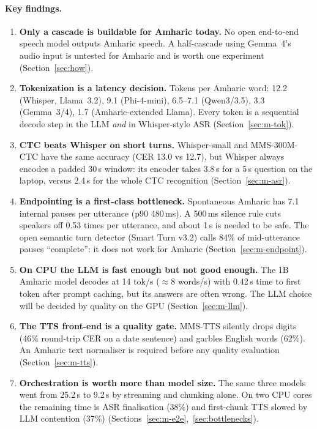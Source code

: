 \paragraph{Key findings.}
\begin{enumerate}
  \item \textbf{Only a cascade is buildable for Amharic today.} No open end-to-end speech model outputs
  Amharic speech. A half-cascade using Gemma~4's audio input is untested for Amharic and is worth one
  experiment (Section~\ref{sec:how}).
  \item \textbf{Tokenization is a latency decision.} Tokens per Amharic word: 12.2 (Whisper, Llama~3.2),
  9.1 (Phi-4-mini), 6.5--7.1 (Qwen3/3.5), 3.3 (Gemma~3/4), 1.7 (Amharic-extended Llama). Every token is a
  sequential decode step in the LLM \emph{and} in Whisper-style ASR (Section~\ref{sec:m-tok}).
  \item \textbf{CTC beats Whisper on short turns.} Whisper-small and MMS-300M-CTC have the same accuracy
  (CER 13.0 vs 12.7), but Whisper always encodes a padded 30\,s window: its encoder takes 3.8\,s for a 5\,s question
  on the laptop, versus 2.4\,s for the whole CTC recognition (Section~\ref{sec:m-asr}).
  \item \textbf{Endpointing is a first-class bottleneck.} Spontaneous Amharic has 7.1 internal pauses per
  utterance (p90 480\,ms). A 500\,ms silence rule cuts speakers off 0.53 times per utterance, and
  about 1\,s is needed to be safe. The open semantic turn detector (Smart Turn v3.2) calls 84\% of mid-utterance
  pauses ``complete'': it does not work for Amharic (Section~\ref{sec:m-endpoint}).
  \item \textbf{On CPU the LLM is fast enough but not good enough.} The 1B Amharic model decodes at 14 tok/s
  ($\approx$8 words/s) with 0.42\,s time to first token after prompt caching, but its answers are often wrong.
  The LLM choice will be decided by quality on the GPU (Section~\ref{sec:m-llm}).
  \item \textbf{The TTS front-end is a quality gate.} MMS-TTS silently drops digits (46\% round-trip CER on a
  date sentence) and garbles English words (62\%). An Amharic text normaliser is required before any
  quality evaluation (Section~\ref{sec:m-tts}).
  \item \textbf{Orchestration is worth more than model size.} The same three models went from 25.2\,s to 9.2\,s
  by streaming and chunking alone. On two CPU cores the remaining time is ASR finalisation (38\%) and
  first-chunk TTS slowed by LLM contention (37\%) (Sections~\ref{sec:m-e2e},~\ref{sec:bottlenecks}).
\end{enumerate}

